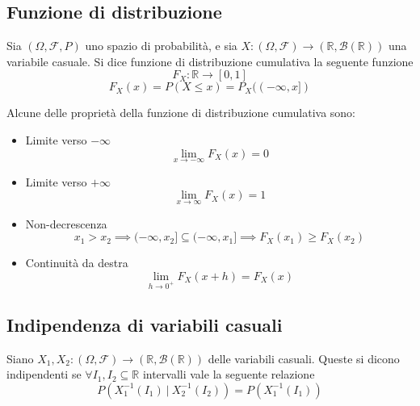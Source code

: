         \subsection{Funzione di distribuzione}
        \begin{definition}
            Sia $(\Omega, \mathcal{F}, P)$ uno spazio di probabilità, e sia $X: (\Omega, \mathcal{F}) \rightarrow (\mathbb{R}, \mathcal{B}(\mathbb{R}))$ una variabile casuale.
            Si dice funzione di distribuzione cumulativa la seguente funzione
            \[
                F_{X}: \mathbb{R} \rightarrow [0, 1]
            \]
            \[
                F_{X}(x) = P(X \leq x) = P_{X}((-\infty, x])
            \]
        \end{definition}

        Alcune delle proprietà della funzione di distribuzione cumulativa sono:
        \begin{itemize}
            \item Limite verso $-\infty$
            \[
                \lim_{x \rightarrow -\infty} F_{X}(x) = 0
            \]

            \item Limite verso $+\infty$
            \[
                \lim_{x \rightarrow \infty} F_{X}(x) = 1
            \]

            \item Non-decrescenza
            \[
                x_{1} > x_{2} \implies (-\infty, x_{2}] \subseteq (-\infty, x_{1}] \implies F_{X}(x_{1}) \geq F_{X}(x_{2})
            \]

            \item Continuità da destra
            \[
                \lim_{h \rightarrow 0^{+}} F_{X}(x + h) = F_{X}(x)
            \]
        \end{itemize}

        \subsection{Indipendenza di variabili casuali}
        \begin{definition}
            Siano $X_{1}, X_{2}: (\Omega, \mathcal{F}) \rightarrow (\mathbb{R}, \mathcal{B}(\mathbb{R}))$ delle variabili casuali.
            Queste si dicono indipendenti se $\forall I_{1}, I_{2} \subseteq \mathbb{R}$ intervalli vale la seguente relazione
            \[
                P(X_{1}^{-1}(I_{1}) \: | \: X_{2}^{-1}(I_{2})) = P(X_{1}^{-1}(I_{1}))
            \]
        \end{definition}

